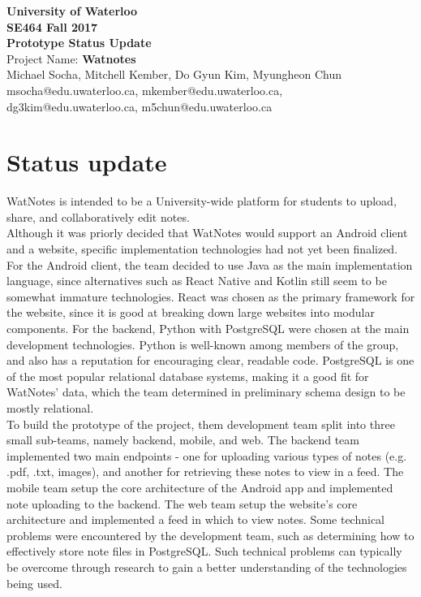 \documentclass[12pt]{article}
\begin{document}
  \begin{center}
  \vspace*{\fill}
  {\Large\bf University of Waterloo}\\
  \vspace{3mm}
  {\large\bf SE464 Fall 2017}\\
  \vspace{3mm}
  {\Large\bf Prototype Status Update}\\
  \vspace{3mm}
  {\Large Project Name: {\bf Watnotes}}\\
  \vspace{5mm}
  Michael Socha, Mitchell Kember, Do Gyun Kim, Myungheon Chun\\
  \vspace{3mm}
  msocha@edu.uwaterloo.ca, mkember@edu.uwaterloo.ca, dg3kim@edu.uwaterloo.ca, m5chun@edu.uwaterloo.ca\\
  \vspace*{\fill}
  \end{center}

  \newpage

\section{Status update}
  WatNotes is intended to be a University-wide platform for students to upload, share, and collaboratively edit notes. \\

  Although it was priorly decided that WatNotes would support an Android client and a website, specific implementation technologies had not yet been finalized. For the Android client, the team decided to use Java as the main implementation language, since alternatives such as React Native and Kotlin still seem to be somewhat immature technologies. React was chosen as the primary framework for the website, since it is good at breaking down large websites into modular components. For the backend, Python with PostgreSQL were chosen at the main development technologies. Python is well-known among members of the group, and also has a reputation for encouraging clear, readable code. PostgreSQL is one of the most popular relational database systems, making it a good fit for WatNotes' data, which the team determined in preliminary schema design to be mostly relational. \\

  To build the prototype of the project, them development team split into three small sub-teams, namely backend, mobile, and web. The backend team implemented two main endpoints - one for uploading various types of notes (e.g. .pdf, .txt, images), and another for retrieving these notes to view in a feed. The mobile team setup the core architecture of the Android app and implemented note uploading to the backend. The web team setup the website's core architecture and implemented a feed in which to view notes. Some technical problems were encountered by the development team, such as determining how to effectively store note files in PostgreSQL. Such technical problems can typically be overcome through research to gain a better understanding of the technologies being used. \\
\end{document}
